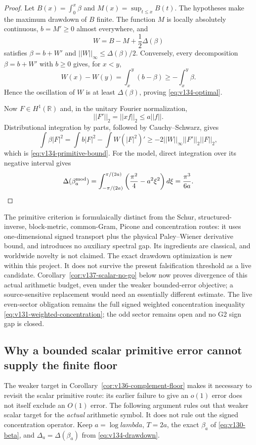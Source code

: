 \documentclass[11pt]{article}
\def\lambda{lambda}%
\def\norm#1{||#1||}%
\theoremstyle{remark}
\newcommand{\norm}[1]{\left\lVert #1\right\rVert}
\begin{document}
\begin{proof}
Let $B(x)=\int_0^x\beta$ and
$M(x)=\sup_{t\le x}B(t)$.  The hypotheses make the maximum drawdown of
$B$ finite.  The function $M$ is locally absolutely continuous,
$b=M'\ge0$ almost everywhere, and
\[
 W=B-M+\frac12\Delta(\beta)
\]
satisfies $\beta=b+W'$ and
$\norm W_\infty\le\Delta(\beta)/2$.  Conversely, every decomposition
$\beta=b+W'$ with $b\ge0$ gives, for $x<y$,
\[
 W(x)-W(y)=\int_x^y(b-\beta)
 \ge-\int_x^y\beta.
\]
Hence the oscillation of $W$ is at least $\Delta(\beta)$, proving
\eqref{eq:v134-optimal}.

Now $F\in H^1(\mathbb R)$ and, in the unitary Fourier normalization,
\[
 \norm{F'}_2=\norm{xf}_2\le a\norm f.
\]
Distributional integration by parts, followed by Cauchy--Schwarz,
gives
\[
 \int\beta|F|^2
 =\int b|F|^2-\int W(|F|^2)'
 \ge-2\norm W_\infty\norm{F'}_2\norm F_2,
\]
which is \eqref{eq:v134-primitive-bound}.  For the model, direct
integration over its negative interval gives
\[
 \Delta(\beta_a^{\rm mod})
 =\int_{-\pi/(2a)}^{\pi/(2a)}
   \left(\frac{\pi^2}{4}-a^2\xi^2\right)d\xi
 =\frac{\pi^3}{6a}.
\]
\end{proof}

The primitive criterion is formulaically distinct from the Schur,
structured-inverse, block-metric, common-Gram, Picone and concentration
routes: it uses one-dimensional signed transport plus the physical
Paley--Wiener derivative bound, and introduces no auxiliary spectral
gap.  Its ingredients are classical, and worldwide novelty is not
claimed.  The exact drawdown optimization is new within this project.
It does not survive the present falsification threshold as a live
candidate. Corollary~\ref{cor:v137-scalar-no-go}
below now proves divergence of this actual arithmetic budget, even
under the weaker bounded-error objective; a source-sensitive replacement
would need an essentially different estimate.  The live even-sector obligation remains the full
signed weighted concentration inequality
\eqref{eq:v131-weighted-concentration}; the odd sector remains open and
no G2 sign gap is closed.


\subsection{Why a bounded scalar primitive error cannot supply the finite floor}

The weaker target in Corollary~\ref{cor:v136-complement-floor} makes it
necessary to revisit the scalar primitive route: its earlier failure to
give an $o(1)$ error does not itself exclude an $O(1)$ error. The following
argument rules out that weaker scalar target for the \emph{actual}
arithmetic symbol. It does not rule out the signed concentration operator.
Keep $a=\log\lambda$, $T=2a$, the exact $\beta_a$ of
\eqref{eq:v130-beta}, and $\Delta_a=\Delta(\beta_a)$ from
\eqref{eq:v134-drawdown}.
\end{document}
